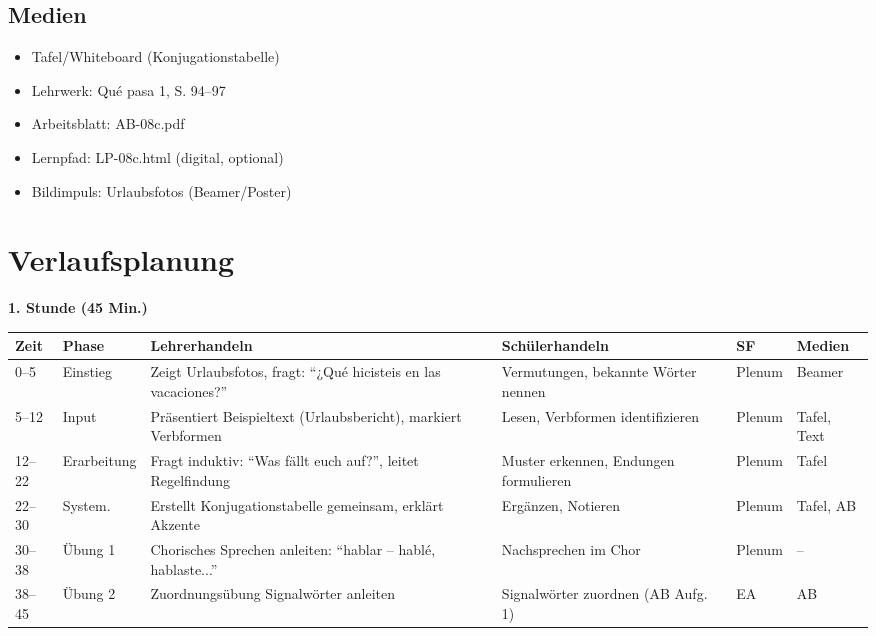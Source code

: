 \documentclass[11pt,a4paper]{article}
\newcommand{\lehrwerk}{Qué pasa 1}
\newcommand{\lehrwerkseite}{S. 94--97}
\begin{document}
\subsection{Medien}
\begin{itemize}
    \item Tafel/Whiteboard (Konjugationstabelle)
    \item Lehrwerk: \lehrwerk, \lehrwerkseite
    \item Arbeitsblatt: AB-08c.pdf
    \item Lernpfad: LP-08c.html (digital, optional)
    \item Bildimpuls: Urlaubsfotos (Beamer/Poster)
\end{itemize}

\section{Verlaufsplanung}

\textbf{1. Stunde (45 Min.)}

\begin{longtable}{|p{1cm}|p{1.5cm}|p{4cm}|p{3cm}|p{2cm}|p{2cm}|}
\hline
\textbf{Zeit} & \textbf{Phase} & \textbf{Lehrerhandeln} & \textbf{Schülerhandeln} & \textbf{SF} & \textbf{Medien} \\
\hline
\endhead

0--5 & Einstieg & Zeigt Urlaubsfotos, fragt: ``¿Qué hicisteis en las vacaciones?'' & Vermutungen, bekannte Wörter nennen & Plenum & Beamer \\
\hline

5--12 & Input & Präsentiert Beispieltext (Urlaubsbericht), markiert Verbformen & Lesen, Verbformen identifizieren & Plenum & Tafel, Text \\
\hline

12--22 & Erar\-beitung & Fragt induktiv: ``Was fällt euch auf?'', leitet Regelfindung & Muster erkennen, Endungen formulieren & Plenum & Tafel \\
\hline

22--30 & System. & Erstellt Konjugationstabelle gemeinsam, erklärt Akzente & Ergänzen, Notieren & Plenum & Tafel, AB \\
\hline

30--38 & Übung 1 & Chorisches Sprechen anleiten: ``hablar -- hablé, hablaste...'' & Nachsprechen im Chor & Plenum & -- \\
\hline

38--45 & Übung 2 & Zuordnungsübung Signalwörter anleiten & Signalwörter zuordnen (AB Aufg. 1) & EA & AB \\
\hline
\end{longtable}
\end{document}
